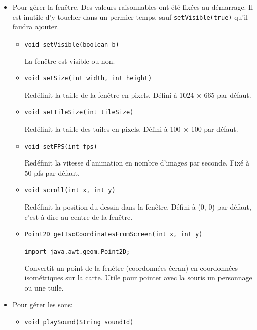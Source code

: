 \documentclass{article}
\newcommand{\code}[1]{\lstinline{#1}}
\begin{document}
\begin{itemize}
\begin{itemize}
    \end{itemize}

    \item Pour gérer la fenêtre. Des valeurs raisonnables ont été fixées au démarrage. Il est inutile d'y toucher dans un permier temps, sauf 
    \code{setVisible(true)} qu'il faudra ajouter.
     
    \begin{itemize}
        \item \code{void setVisible(boolean b)}
        
        La fenêtre est visible ou non.

        \item \code{void setSize(int width, int height)}

        Redéfinit la taille de la fenêtre en pixels. Défini à 1024 $\times$ 665 par défaut.

        \item \code{void setTileSize(int tileSize)}
        
        Redéfinit la taille des tuiles en pixels. Défini à 100 $\times$ 100 par défaut.

        \item \code{void setFPS(int fps)}
        
            Redéfinit la vitesse d'animation en nombre d'images par seconde. Fixé à 50 pfs par défaut.

        \item \code{void scroll(int x, int y)}
        
            Redéfinit la position du dessin dans la fenêtre. Défini à (0, 0) par défaut, c'est-à-dire au centre de la fenêtre.

        \item \code{Point2D getIsoCoordinatesFromScreen(int x, int y)}
        
            \code{import java.awt.geom.Point2D;}

            Convertit un point de la fenêtre (coordonnées écran) en coordonnées isométriques sur la carte.
            Utile pour pointer avec la souris un personnage ou une tuile.

    \end{itemize}

    \item Pour gérer les sons:
    \begin{itemize}

    \item \code{void playSound(String soundId)}
    

\end{itemize}
\end{itemize}
\end{document}

